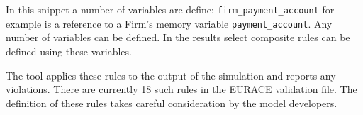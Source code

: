 In this snippet a number of variables are define: \texttt{firm\_payment\_account} for example is a reference to a Firm's memory variable \texttt{payment\_account}. Any number of variables can be defined. In the results select composite rules can be defined using these variables.


The tool applies these rules to the output of the simulation and reports any violations. There are currently 18 such rules in the EURACE validation file. The definition of these rules takes careful consideration by the model developers.




